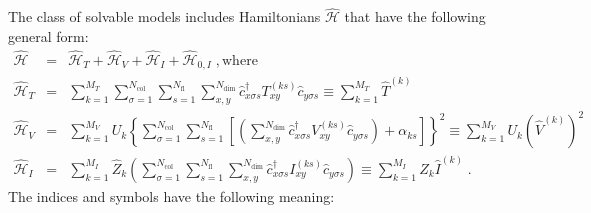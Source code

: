 \documentclass{SciPost}
\begin{document}
The class of solvable models includes  Hamiltonians $\hat{\mathcal{H}}$ that have the following general form:
\begin{eqnarray}
\hat{\mathcal{H}}&=&\hat{\mathcal{H}}_{T}+\hat{\mathcal{H}}_{V} +  \hat{\mathcal{H}}_{I} +   \hat{\mathcal{H}}_{0,I}\;,\mathrm{where}
\label{eqn:general_ham}\\
\hat{\mathcal{H}}_{T}
&=&
\sum\limits_{k=1}^{M_T}
\sum\limits_{\sigma=1}^{N_{\mathrm{col}}}
\sum\limits_{s=1}^{N_{\mathrm{fl}}}
\sum\limits_{x,y}^{N_{\mathrm{dim}}}
\hat{c}^{\dagger}_{x \sigma   s}T_{xy}^{(k s)} \hat{c}^{\phantom\dagger}_{y \sigma s}  \equiv  \sum\limits_{k=1}^{M_T} \hat{T}^{(k)}
\label{eqn:general_ham_t}\\
\hat{\mathcal{H}}_{V}
&=&
\sum\limits_{k=1}^{M_V}U_{k}
\left\{
\sum\limits_{\sigma=1}^{N_{\mathrm{col}}}
\sum\limits_{s=1}^{N_{\mathrm{fl}}}
\left[
\left(
\sum\limits_{x,y}^{N_{\mathrm{dim}}}
\hat{c}^{\dagger}_{x \sigma s}V_{xy}^{(k s)}\hat{c}^{\phantom\dagger}_{y \sigma s}
\right)
+\alpha_{k s} 
\right]
\right\}^{2}  \equiv   
\sum\limits_{k=1}^{M_V}U_{k}   \left(\hat{V}^{(k)} \right)^2
\label{eqn:general_ham_v}\\
\hat{\mathcal{H}}_{I}  & = &
\sum\limits_{k=1}^{M_I} \hat{Z}_{k} 
\left(
\sum\limits_{\sigma=1}^{N_{\mathrm{col}}}
\sum\limits_{s=1}^{N_{\mathrm{fl}}}
\sum\limits_{x,y}^{N_{\mathrm{dim}}}
\hat{c}^{\dagger}_{x \sigma s} I_{xy}^{(k s)}\hat{c}^{\phantom\dagger}_{y \sigma s}
\right) \equiv \sum\limits_{k=1}^{M_I} \hat{Z}_{k}    \hat{I}^{(k)} 
\;.\label{eqn:general_ham_i}
\end{eqnarray}
The indices and symbols have the following meaning:
\end{document}
